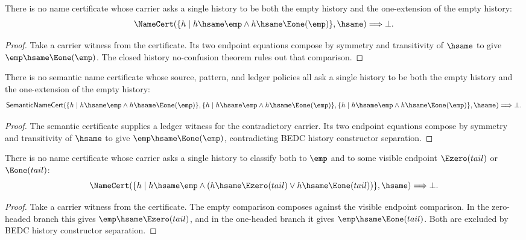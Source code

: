 \begin{theorem}
\label{thm:empty-contradictory-carrier-namecert-absurd}
There is no name certificate whose carrier asks a single history to be both
the empty history and the one-extension of the empty history:
$$
\NameCert(\{h\mid h\hsame\emp\land h\hsame\Eone(\emp)\},\hsame)
\Longrightarrow \bot.
$$
\end{theorem}
\begin{proof}
Take a carrier witness from the certificate. Its two endpoint equations compose
by symmetry and transitivity of $\hsame$ to give
$\emp\hsame\Eone(\emp)$. The closed history no-confusion theorem rules out
that comparison.
\end{proof}

\begin{theorem}
\label{thm:empty-contradictory-carrier-semantic-namecert-absurd}
There is no semantic name certificate whose source, pattern, and ledger
policies all ask a single history to be both the empty history and the
one-extension of the empty history:
$$
\mathsf{SemanticNameCert}
(\{h\mid h\hsame\emp\land h\hsame\Eone(\emp)\},
\{h\mid h\hsame\emp\land h\hsame\Eone(\emp)\},
\{h\mid h\hsame\emp\land h\hsame\Eone(\emp)\},\hsame)
\Longrightarrow \bot.
$$
\end{theorem}
\begin{proof}
The semantic certificate supplies a ledger witness for the contradictory
carrier. Its two endpoint equations compose by symmetry and transitivity of
$\hsame$ to give $\emp\hsame\Eone(\emp)$, contradicting BEDC history
constructor separation.
\end{proof}

\begin{theorem}
\label{thm:empty-visible-contradictory-carrier-namecert-absurd}
There is no name certificate whose carrier asks a single history to classify
both to $\emp$ and to some visible endpoint $\Ezero(tail)$ or $\Eone(tail)$:
$$
\NameCert(\{h\mid h\hsame\emp\land
(h\hsame\Ezero(tail)\lor h\hsame\Eone(tail))\},\hsame)
\Longrightarrow \bot.
$$
\end{theorem}
\begin{proof}
Take a carrier witness from the certificate. The empty comparison composes
against the visible endpoint comparison. In the zero-headed branch this gives
$\emp\hsame\Ezero(tail)$, and in the one-headed branch it gives
$\emp\hsame\Eone(tail)$. Both are excluded by BEDC history constructor
separation.
\end{proof}

